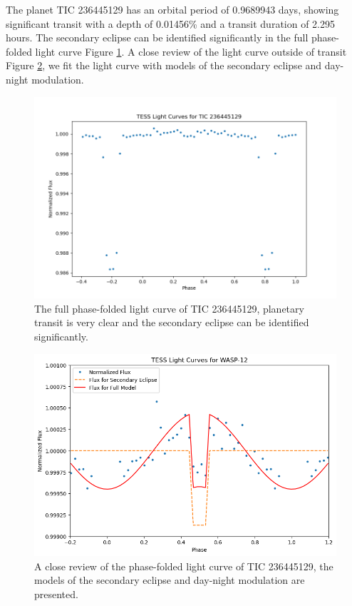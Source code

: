 \documentclass{article}
\begin{document}
The planet TIC 236445129 has an orbital period of 0.9689943 days, showing significant transit with a depth of 0.01456\% and a transit duration of 2.295 hours. The secondary eclipse can be identified significantly in the full phase-folded light curve Figure \ref{fig:236445129_folded}. A close review of the light curve outside of transit Figure \ref{fig:236445129}, we fit the light curve with models of the secondary eclipse and day-night modulation.\begin{figure}[H]\centering\includegraphics[width=0.7\linewidth]{image/236445129_folded.png}\captionsetup{font=small} \caption{The full phase-folded light curve of TIC 236445129, planetary transit is very clear and the secondary eclipse can be identified significantly.}\label{fig:236445129_folded}\end{figure}\begin{figure}[H]\centering\includegraphics[width=0.65\linewidth]{image/236445129.png}\captionsetup{font=small} \caption{A close review of the phase-folded light curve of TIC 236445129, the models of the secondary eclipse and day-night modulation are presented.}\label{fig:236445129}\end{figure}
\newpage
\end{document}

